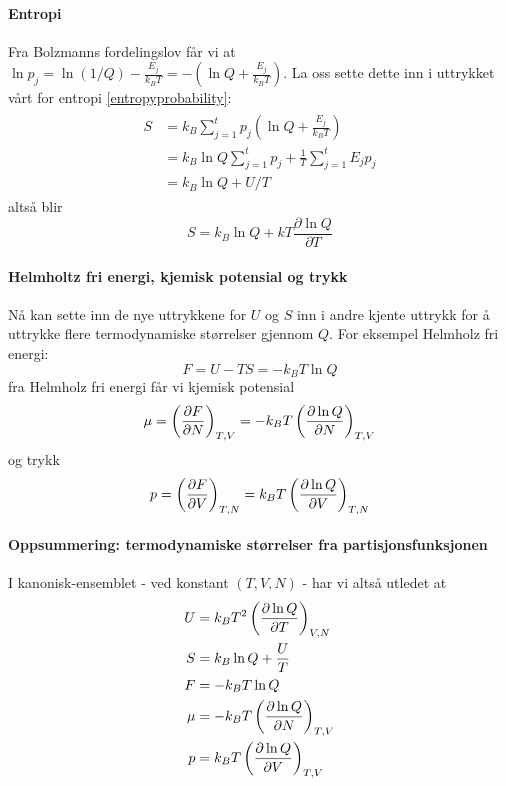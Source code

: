 \paragraph{Entropi} Fra Bolzmanns fordelingslov får vi at $\ln p_j=\ln(1/Q)-\frac{E_j}{k_BT}=-(\ln Q+\frac{E_j}{k_BT})$. La oss sette dette inn i uttrykket vårt for entropi \eqref{entropyprobability}: 
\begin{align}
\begin{split}
	S&=k_B\sum_{j=1}^t p_j(\ln Q+\frac{E_j}{k_BT})\\&=k_B\ln Q\sum_{j=1}^t p_j + \frac{1}{T}\sum_{j=1}^t E_jp_j \\&= k_B\ln Q+U/T
\end{split}
\end{align}
altså blir 
\begin{equation}
	S=k_B\ln Q+kT\frac{\partial \ln Q}{\partial T}
\end{equation}

\paragraph{Helmholtz fri energi, kjemisk potensial og trykk} Nå kan sette inn de nye uttrykkene for $U$ og $S$ inn i andre kjente uttrykk for å uttrykke flere termodynamiske størrelser gjennom $Q$. For eksempel Helmholz fri energi:
\begin{equation}
	F = U - TS = -k_BT\ln Q
\end{equation}
fra Helmholz fri energi får vi kjemisk potensial
\begin{equation}
	\mu = \left(\frac{\partial F}{\partial N}\right)_{T,V} = -k_BT\left(\frac{\partial \ln Q}{\partial N}\right)_{T,V}
\end{equation}
og trykk
\begin{equation}
	\label{pressurefrompartition}
	p = \left(\frac{\partial F}{\partial V}\right)_{T,N}=k_BT\left(\frac{\partial \ln Q}{\partial V}\right)_{T,N}
\end{equation}

\paragraph{Oppsummering: termodynamiske størrelser fra partisjonsfunksjonen}
I kanonisk-ensemblet - ved konstant $(T,V,N)$ - har vi altså utledet at
\begin{align*}
    U&=k_BT^2\left(\frac{\partial \ln Q}{\partial T}\right)_{V,N} \\
    S&=k_B\ln Q+\frac{U}{T} \\
    F&=-k_BT\ln Q \\
    \mu&=-k_BT\left(\frac{\partial \ln Q}{\partial N}\right)_{T,V} \\
    p&=k_BT\left(\frac{\partial \ln Q}{\partial V}\right)_{T,V}
\end{align*}


